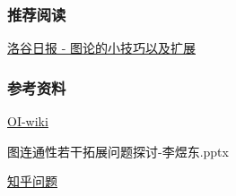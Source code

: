 \documentclass{beamer}
\begin{document}
  \begin{frame}
    \frametitle{推荐阅读}

    \href{https://www.luogu.com.cn/blog/chengni5673/tu-lun-di-xiao-ji-qiao-yi-ji-kuo-zhan}{洛谷日报 - 图论的小技巧以及扩展}
  \end{frame}

  \begin{frame}
    \frametitle{参考资料}

    \href{https://oi-wiki.org/}{OI-wiki}

    \vspace*{1\baselineskip}
    
    图连通性若干拓展问题探讨-李煜东.pptx

    \vspace*{1\baselineskip}

    \href{https://www.zhihu.com/question/292283275/answer/484871888}{知乎问题}
  
  \end{frame}
\end{document}
